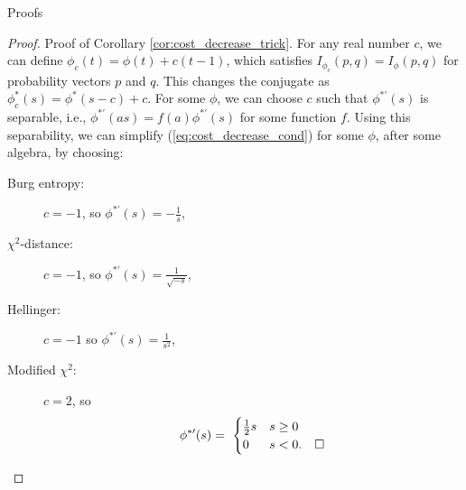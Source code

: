 \documentclass[ijoc,letterpaper]{informs3} %
\begin{document}
\begin{APPENDIX}{Proofs}
\begin{proof}{\sc Proof of Corollary \ref{cor:cost_decrease_trick}.}
	For any real number $c$, we can define $\phi_c(t) = \phi(t) + c(t-1)$, which satisfies $I_{\phi_c}(p,q) = I_\phi(p,q)$ for probability vectors $p$ and $q$.
	This changes the conjugate as $\phi_c^*(s) = \phi^*(s-c) + c$.
	For some $\phi$, we can choose $c$ such that $\phi^{*\prime}(s)$ is separable, i.e., $\phi^{*\prime}(as) = f(a) \phi^{*\prime}(s)$ for some function $f$.
	Using this separability, we can simplify (\ref{eq:cost_decrease_cond}) for some $\phi$, after some algebra, by choosing:\vspace*{-0.15in}
	\begin{multicols}{2}
	\begin{description} 
		\item[Burg entropy:]  $c = -1$, so $\phi^{*\prime}(s) = -\frac{1}{s}$,
		\item[$\chi^2$-distance:] $c = -1$, so $\phi^{*\prime}(s) = \frac{1}{\sqrt{-s}}$,
		\item[Hellinger:]  $c = -1$ so $\phi^{*\prime}(s) = \frac{1}{s^2}$, 
		\item[Modified $\chi^2$:] $c = 2$, so
		\[
			\phi^{*\prime}(s) = \
			\begin{cases}
				\frac{1}{2} s & s \geq 0 \\
				0 & s < 0.   \mbox{\quad$\square$}
			\end{cases}
		\]
	\end{description}
	\end{multicols}
\end{proof}


\end{APPENDIX}
\end{document}
